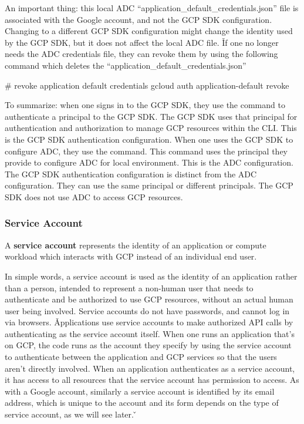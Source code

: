 An important thing: this local ADC ``application\_default\_credentials.json'' file is associated with the Google
account, and not the GCP SDK configuration. Changing to a different GCP SDK configuration might change the identity
used by the GCP SDK, but it does not affect the local ADC file. \v

If one no longer needs the ADC credentials file, they can revoke them by using the following command which deletes
the ``application\_default\_credentials.json''
\begin{bash}
# revoke application default credentials
gcloud auth application-default revoke
\end{bash}

To summarize: when one signs in to the GCP SDK, they use the  command to authenticate a
principal to the GCP SDK. The GCP SDK uses that principal for authentication and authorization to manage GCP
resources within the CLI. This is the GCP SDK authentication configuration. When one uses the GCP SDK to configure
ADC, they use the  command. This command uses the principal they provide
to configure ADC for local environment. This is the ADC configuration. The GCP SDK authentication configuration is
distinct from the ADC configuration. They can use the same principal or different principals. The GCP SDK does not
use ADC to access GCP resources.


\subsubsection{Service Account}

A \textbf{service account} represents the identity of an application or compute workload which interacts with GCP
instead of an individual end user.
\ed

In simple words, a service account is used as the identity of an application rather than a person, intended to represent
a non-human user that needs to authenticate and be authorized to use GCP resources, without an actual human user being
involved. Service accounts do not have passwords, and cannot log in via browsers. \v

Applications use service accounts to make authorized API calls by authenticating as the service account itself. When
one runs an application that's on GCP, the code runs as the account they specify by using the service account to
authenticate between the application and GCP services so that the users aren't directly involved. When an application
authenticates as a service account, it has access to all resources that the service account has permission to access. As
with a Google account, similarly a service account is identified by its email address, which is unique to the account
and its form depends on the type of service account, as we will see later. \v

